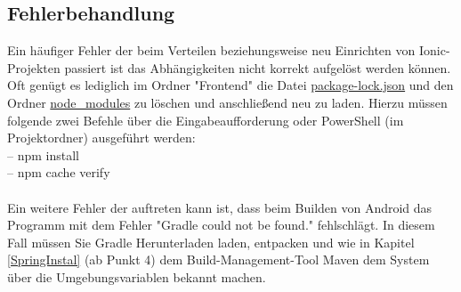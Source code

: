 \subsection{Fehlerbehandlung}\label{IonicFehler}
Ein häufiger Fehler der beim Verteilen beziehungsweise neu Einrichten von Ionic-Projekten passiert ist das Abhängigkeiten nicht korrekt aufgelöst werden können. Oft genügt es lediglich im Ordner "Frontend" die Datei \underline{package-lock.json} und den Ordner \underline{node\_modules} zu löschen und anschließend neu zu laden. Hierzu müssen folgende zwei Befehle über die Eingabeaufforderung oder PowerShell (im Projektordner) ausgeführt werden:\\
-- npm install\\
-- npm cache verify
\\\\
Ein weitere Fehler der auftreten kann ist, dass beim Builden von Android das Programm mit dem Fehler "Gradle could not be found." fehlschlägt. In diesem Fall müssen Sie Gradle Herunterladen laden, entpacken und wie in Kapitel \ref{SpringInstal} (ab Punkt 4) dem Build-Management-Tool Maven dem System über die Umgebungsvariablen bekannt machen. 